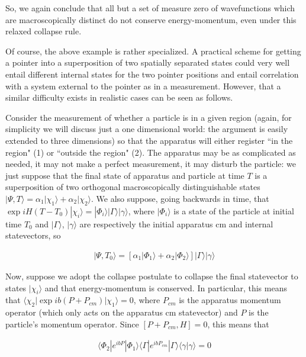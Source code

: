 \documentclass[12pt]{article}
\begin{document}
	So, we again conclude that all but a set of measure zero of 
wavefunctions which are macroscopically distinct do not conserve energy-momentum, 
even under this relaxed collapse rule. 

	Of course, the above example is rather specialized.  A practical 
scheme for getting a pointer into a superposition of two spatially separated states could very well entail 
different internal states for the two pointer positions and entail correlation with a system 
external to the pointer as in a measurement.  However, that a similar difficulty exists 
in realistic cases can be seen as follows\cite{Goldberg}.

	Consider the measurement of whether a particle is in a given region (again, for simplicity we will discuss 
just a one dimensional world: the argument is easily extended to three dimensions) so that the apparatus 
will either register ``in the region" (1) or ``outside the region" (2).  The apparatus may be as 
complicated as needed, it may not make a perfect measurement, it may disturb the particle: 
we just suppose that the final state of apparatus and particle at time $T$ is a superposition of two orthogonal 
macroscopically distinguishable states
$|\Psi,T\rangle = \alpha_{1}|\chi_{1}\rangle+\alpha_{2}|\chi_{2}\rangle$. We also suppose, going backwards 
in time, that $\exp iH(T-T_{0})|\chi_{i}\rangle=|\Phi_{i}\rangle|\Gamma\rangle|\gamma\rangle$, where 
$|\Phi_{i}\rangle$ is a state of the particle at initial time $T_{0}$ and $|\Gamma\rangle$, $|\gamma\rangle$ are 
respectively the initial apparatus cm and internal statevectors, so 
 
\begin{eqnarray*}
|\Psi, T_{0}\rangle=[\alpha_{1}|\Phi_{1}\rangle+\alpha_{2}|\Phi_{2}\rangle]|\Gamma\rangle|\gamma\rangle
\end{eqnarray*}

	Now, suppose we adopt the collapse postulate to 
collapse the final statevector to states $|\chi_{i}\rangle$ and that 
energy-momentum is conserved. In particular, this means that 
$\langle \chi_{2}|\exp ib(P+P_{cm})|\chi_{1}\rangle=0$, where $P_{cm}$ is the apparatus 
momentum operator (which only acts on the apparatus cm statevector) and $P$ is the particle's 
momentum operator.  Since $[P+P_{cm},H]=0$, this means that 

\begin{eqnarray*}
\langle\Phi_{2}| e^{ibP}|\Phi_{1}\rangle\langle\Gamma| e^{ibP_{cm}}|\Gamma\rangle
\langle\gamma|\gamma\rangle=0
\end{eqnarray*} 
\end{document}
